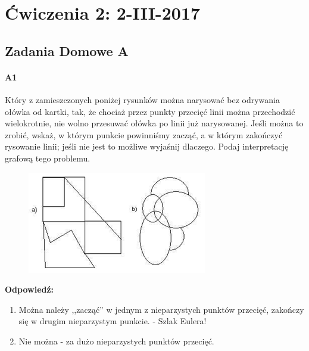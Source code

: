 \section{Ćwiczenia 2: 2-III-2017}
\subsection{Zadania Domowe A}
\paragraph{A1}  Który  z  zamieszczonych  poniżej  rysunków  można narysować  bez  odrywania  ołówka  od  kartki, tak,  że chociaż  przez punkty przecięć linii można przechodzić wielokrotnie,  nie wolno  przesuwać  ołówka  po linii  już narysowanej. Jeśli można to zrobić, wskaż,  w którym punkcie  powinniśmy  zacząć,  a  w  którym  zakończyć rysowanie   linii;   jeśli   nie   jest   to   możliwe   wyjaśnij dlaczego.  Podaj  interpretację  grafową   tego problemu.
\begin{figure}[H]
\includegraphics{img/g1}
\end{figure}
\textbf{Odpowiedź:}
\begin{enumerate}[label=\alph*)]
\item Można należy ,,zacząć'' w jednym z nieparzystych punktów przecięć, zakończy się w drugim nieparzystym punkcie. - Szlak Eulera!
\item Nie można - za dużo nieparzystych punktów przecięć.
\end{enumerate}

